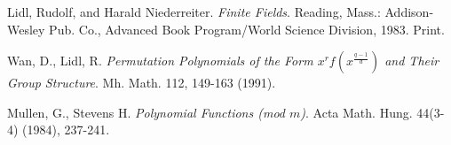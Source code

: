 \documentclass{article}
\theoremstyle{definition}
\theoremstyle{remark}
\numberwithin{equation}{section}
\begin{document}
\begin{thebibliography}{}

  \item Lidl, Rudolf, and Harald Niederreiter. \textit{Finite Fields}. Reading, Mass.: Addison-Wesley Pub. Co., Advanced Book Program/World Science Division, 1983. Print. 
  \item Wan, D., Lidl, R. \textit{Permutation Polynomials of the Form $x^{r}f(x^{\frac{q-1}{d}})$ and Their Group Structure}. Mh. Math. 112, 149-163 (1991).
  \item Mullen, G., Stevens H. \textit{Polynomial Functions (mod $m$)}. Acta Math. Hung. 44(3-4) (1984), 237-241.

\end{thebibliography}
\end{document}
